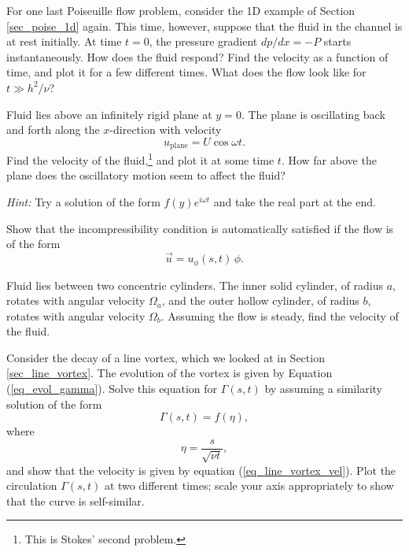 \begin{problem}
\label{prob_poise_time}
For one last Poiseuille flow problem, consider the 1D example of Section \ref{sec_poise_1d} again.  This time, however, suppose that the fluid in the channel is at rest initially.  At time $t = 0$, the pressure gradient $dp/dx = -P$ starts instantaneously.  How does the fluid respond?  Find the velocity as a function of time, and plot it for a few different times.  What does the flow look like for $t \gg h^2 / \nu$?
\end{problem}

\begin{problem}
\label{prob_cyl_osc}
Fluid lies above an infinitely rigid plane at $y=0$.  The plane is oscillating back and forth along the $x$-direction with velocity
\[
u_\text{plane} = U \cos \omega t.
\]
Find the velocity of the fluid,\footnote{This is Stokes' second problem.} and plot it at some time $t$.  How far above the plane does the oscillatory motion seem to affect the fluid?

\emph{Hint:}  Try a solution of the form $f(y) e^{i \omega t}$ and take the real part at the end.
\end{problem}

\begin{problem}
\label{prob_cyl_incomp}
Show that the incompressibility condition is automatically satisfied if the flow is of the form 
\[
\vec{u} = u_\phi (s, t) \, \unit{\phi}.
\]
\end{problem}

\begin{problem}
\label{prob_cyl_two}
Fluid lies between two concentric cylinders.  The inner solid cylinder, of radius $a$, rotates with angular velocity $\Omega_a$, and the outer hollow cylinder, of radius $b$, rotates with angular velocity $\Omega_b$.  Assuming the flow is steady, find the velocity of the fluid.
\end{problem}

\begin{problem}
\label{prob_sim}
Consider the decay of a line vortex, which we looked at in Section \ref{sec_line_vortex}.  The evolution of the vortex is given by Equation (\ref{eq_evol_gamma}).  Solve this equation for $\Gamma(s, t)$ by assuming a similarity solution of the form
\[
\Gamma(s, t) = f(\eta),
\]
where 
\[
\eta = \frac{s}{\sqrt{\nu t}},
\]
and show that the velocity is given by equation (\ref{eq_line_vortex_vel}).  Plot the circulation $\Gamma(s, t)$ at two different times; scale your axis appropriately to show that the curve is self-similar.
\end{problem}

